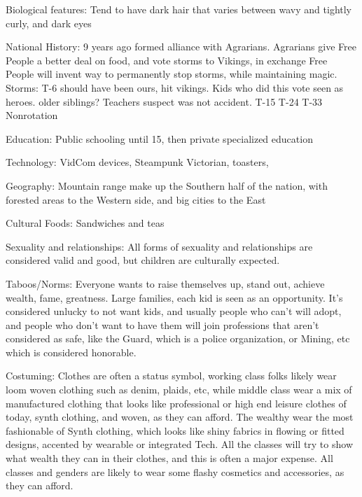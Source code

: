 \documentclass[blue]{GL2020}
\begin{document}
	
Biological features:	Tend to have dark hair that varies between wavy and tightly curly, and dark eyes

National History:		9 years ago formed alliance with Agrarians.  Agrarians give Free People a better deal on food, and vote storms to Vikings, in exchange Free People will invent way to permanently stop storms, while maintaining magic.  %
	Storms:		T-6 should have been ours, hit vikings.  Kids who did this vote seen as heroes.  older siblings?  Teachers suspect was not accident.
						T-15
						T-24
						T-33
						Nonrotation
	
Education:	Public schooling until 15, then private specialized education

Technology:		VidCom devices, Steampunk Victorian, toasters, 

Geography:	Mountain range make up the Southern half of the nation, with forested areas to the Western side, and big cities to the East

Cultural Foods:	Sandwiches and teas

Sexuality and relationships:	All forms of sexuality and relationships are considered valid and good, but children are culturally expected.

Taboos/Norms:		Everyone wants to raise themselves up, stand out, achieve wealth, fame, greatness.  Large families, each kid is seen as an opportunity.  It's considered unlucky to not want kids, and usually people who can't will adopt, and people who don't want to have them will join professions that aren't considered as safe, like the Guard, which is a police organization, or Mining, etc which is considered honorable.

Costuming:		Clothes are often a status symbol, working class folks likely wear loom woven clothing such as denim, plaids, etc, while middle class wear a mix of manufactured clothing that looks like professional or high end leisure clothes of today, synth clothing, and woven, as they can afford.  The wealthy wear the most fashionable of Synth clothing, which looks like shiny fabrics in flowing or fitted designs, accented by wearable or integrated Tech.  All the classes will try to show what wealth they can in their clothes, and this is often a major expense.  All classes and genders are likely to wear some flashy cosmetics and accessories, as they can afford.
\end{document}

